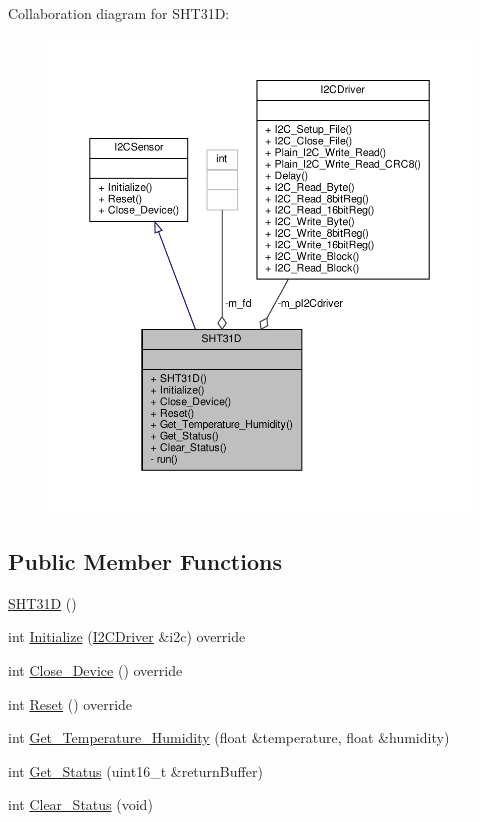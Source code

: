 Collaboration diagram for S\+H\+T31D\+:\nopagebreak
\begin{figure}[H]
\begin{center}
\leavevmode
\includegraphics[width=350pt]{classSHT31D__coll__graph}
\end{center}
\end{figure}
\subsection*{Public Member Functions}
\begin{DoxyCompactItemize}
\item 
\hyperlink{classSHT31D_a697a7f48dbe4c821e81de47d8fbb2c74}{S\+H\+T31D} ()
\item 
int \hyperlink{classSHT31D_af3ec39a4f04344a1b422761cc904343e}{Initialize} (\hyperlink{classI2CDriver}{I2\+C\+Driver} \&i2c) override
\item 
int \hyperlink{classSHT31D_a925cd964b0a6535d40dff588ac7d02be}{Close\+\_\+\+Device} () override
\item 
int \hyperlink{classSHT31D_aa5d28c2557ed05435ca9b433492b9b07}{Reset} () override
\item 
int \hyperlink{classSHT31D_a749e5909bbd129e6352a32f28aef96d8}{Get\+\_\+\+Temperature\+\_\+\+Humidity} (float \&temperature, float \&humidity)
\item 
int \hyperlink{classSHT31D_ada8e1773dee18a8a76656bb2d41b19f1}{Get\+\_\+\+Status} (uint16\+\_\+t \&return\+Buffer)
\item 
int \hyperlink{classSHT31D_a29d822bbc17bae95b35270128942c2ba}{Clear\+\_\+\+Status} (void)
\end{DoxyCompactItemize}
